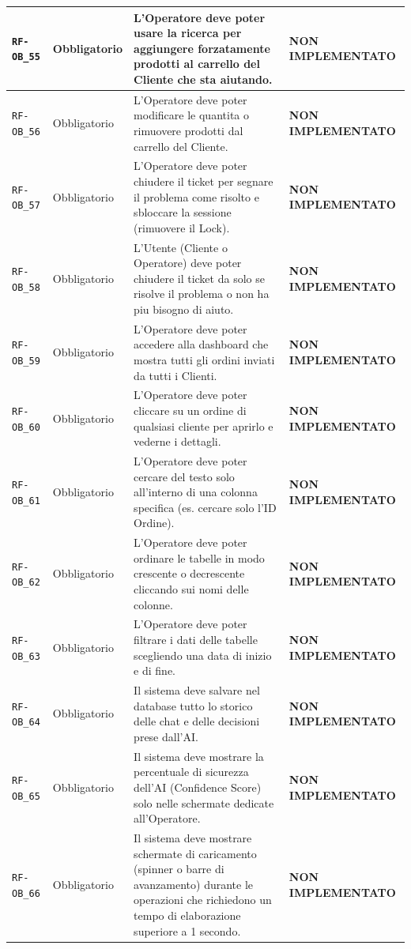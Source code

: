 \documentclass[a4paper, 11pt, oneside]{scrartcl}
\begin{document}
\begin{longtable}{|>{\raggedright\arraybackslash}p{}|>{\raggedright\arraybackslash}p{}|>{\raggedright\arraybackslash}p{}|>{\raggedright\arraybackslash}p{}|}
    \hline
    \texttt{RF-OB\_55} & Obbligatorio & L'Operatore deve poter usare la ricerca per aggiungere forzatamente prodotti al carrello del Cliente che sta aiutando. & \textbf{NON IMPLEMENTATO} \\
    \hline
    \texttt{RF-OB\_56} & Obbligatorio & L'Operatore deve poter modificare le quantita o rimuovere prodotti dal carrello del Cliente. & \textbf{NON IMPLEMENTATO} \\
    \hline
    \texttt{RF-OB\_57} & Obbligatorio & L'Operatore deve poter chiudere il ticket per segnare il problema come risolto e sbloccare la sessione (rimuovere il Lock). & \textbf{NON IMPLEMENTATO} \\
    \hline
    \texttt{RF-OB\_58} & Obbligatorio & L'Utente (Cliente o Operatore) deve poter chiudere il ticket da solo se risolve il problema o non ha piu bisogno di aiuto. & \textbf{NON IMPLEMENTATO} \\
    \hline
    \texttt{RF-OB\_59} & Obbligatorio & L'Operatore deve poter accedere alla dashboard che mostra tutti gli ordini inviati da tutti i Clienti. & \textbf{NON IMPLEMENTATO} \\
    \hline
    \texttt{RF-OB\_60} & Obbligatorio & L'Operatore deve poter cliccare su un ordine di qualsiasi cliente per aprirlo e vederne i dettagli. & \textbf{NON IMPLEMENTATO} \\
    \hline
    \texttt{RF-OB\_61} & Obbligatorio & L'Operatore deve poter cercare del testo solo all'interno di una colonna specifica (es. cercare solo l'ID Ordine). & \textbf{NON IMPLEMENTATO} \\
    \hline
    \texttt{RF-OB\_62} & Obbligatorio & L'Operatore deve poter ordinare le tabelle in modo crescente o decrescente cliccando sui nomi delle colonne. & \textbf{NON IMPLEMENTATO} \\
    \hline
    \texttt{RF-OB\_63} & Obbligatorio & L'Operatore deve poter filtrare i dati delle tabelle scegliendo una data di inizio e di fine. & \textbf{NON IMPLEMENTATO} \\
    \hline
    \texttt{RF-OB\_64} & Obbligatorio & Il sistema deve salvare nel database tutto lo storico delle chat e delle decisioni prese dall'AI. & \textbf{NON IMPLEMENTATO} \\
    \hline
    \texttt{RF-OB\_65} & Obbligatorio & Il sistema deve mostrare la percentuale di sicurezza dell'AI (Confidence Score) solo nelle schermate dedicate all'Operatore. & \textbf{NON IMPLEMENTATO} \\
    \hline
    \texttt{RF-OB\_66} & Obbligatorio & Il sistema deve mostrare schermate di caricamento (spinner o barre di avanzamento) durante le operazioni che richiedono un tempo di elaborazione superiore a 1 secondo. & \textbf{NON IMPLEMENTATO} \\

\end{longtable}
\end{document}
